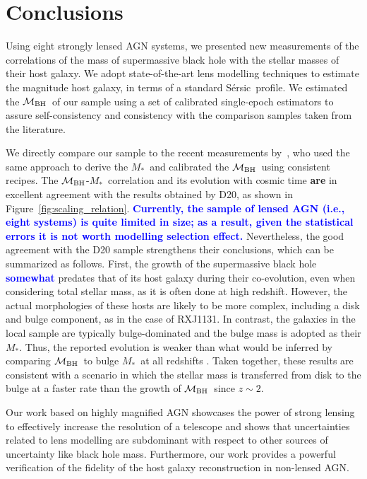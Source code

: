 \documentclass[fleqn,usenatbib]{mnras}
\newcommand{\mbh}{$\mathcal M_{\rm BH}$}
\newcommand{\sersic}{S\'ersic}
\newcommand{\mstar}{{$M_*$}}
\newcommand{\blue}[1]{{\bf \textcolor{blue}{#1}}}
\begin{document}
\section{Conclusions}\label{sec:con}
Using eight strongly lensed AGN systems, we presented new measurements of the correlations of the mass of supermassive black hole with the stellar masses of their host galaxy. We adopt state-of-the-art lens modelling techniques to estimate the magnitude host galaxy, in terms of a standard \sersic\ profile. We estimated the \mbh\ of our sample using a set of calibrated single-epoch estimators to assure self-consistency and consistency with the comparison samples taken from the literature.

We directly compare our sample to the recent measurements by~\citet[][D20]{Ding2020a}, who used the same approach to derive the \mstar\ and calibrated the \mbh\ using consistent recipes. The \mbh-\mstar\ correlation and its evolution with cosmic time {\bf are} in excellent agreement with the results obtained by D20, as shown in Figure~\ref{fig:scaling_relation}. \blue{Currently, the sample of lensed AGN (i.e., eight systems) is quite limited in size; as a result, given the statistical errors it is not worth modelling selection effect.} Nevertheless, the good agreement with the D20 sample strengthens their conclusions, which can be summarized as follows. First, the growth of the supermassive black hole \blue{somewhat} predates that of its host galaxy during their co-evolution, even when considering total stellar mass, as it is often done at high redshift. However, the actual morphologies of these hosts are likely to be more complex, including a disk and bulge component, as in the case of  RXJ1131. In contrast, the galaxies in the local sample are typically bulge-dominated and the bulge mass is adopted as their  \mstar. Thus, the reported evolution is weaker than what would be inferred by comparing \mbh\ to bulge \mstar\ at all redshifts \citep{Bennert++2011}. Taken together, these results are consistent with a scenario in which the stellar mass is transferred from disk to the bulge at a faster rate than the growth of \mbh\ since $z\sim2$.

Our work based on highly magnified AGN showcases the power of strong lensing to effectively increase the resolution of a telescope and shows that uncertainties related to lens modelling are subdominant with respect to other sources of uncertainty like black hole mass. Furthermore, our work provides a powerful verification of the fidelity of the host galaxy reconstruction in non-lensed AGN. 
\end{document}
